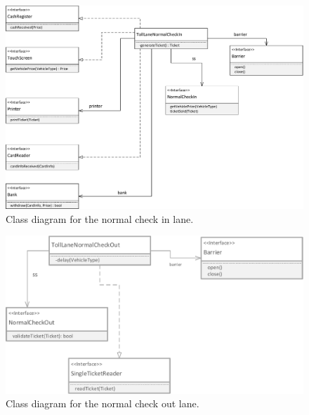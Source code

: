 \begin{figure}[H]
\centerline{\includegraphics[width=\textwidth]{img/class_diagram/class_diagram_toll_lane_normal_check_in}}
\caption{Class diagram for the normal check in lane.}
\label{fig:cld_tlni}
\end{figure}

\begin{figure}[H]
\centerline{\includegraphics[width=\textwidth]{img/class_diagram/class_diagram_toll_lane_normal_check_out}}
\caption{Class diagram for the normal check out lane.}
\label{fig:cld_tlno}
\end{figure}